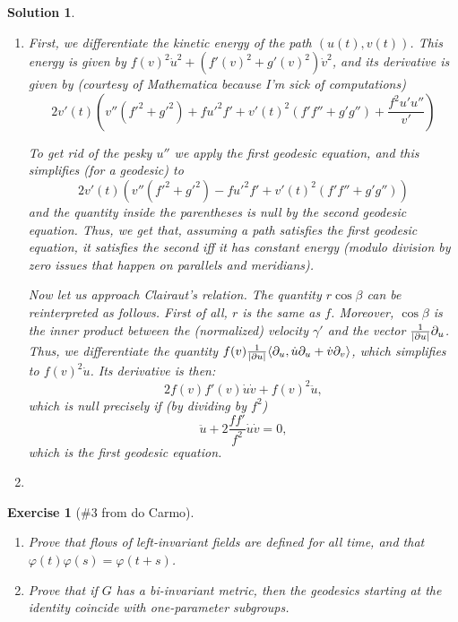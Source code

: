\documentclass{article}
\theoremstyle{plain}
\newtheorem*{ex}{Exercise}
\theoremstyle{nonumberplain}
\newtheorem{sol}{Solution}
\DeclarePairedDelimiter{\abs}{\lvert}{\rvert}
\DeclarePairedDelimiter{\braket}{\langle}{\rangle}
\begin{document}
\begin{sol}
\begin{enumerate}
\item First, we differentiate the kinetic energy of the path $(u(t), v(t))$. This energy is given by $f(v)^2 \dot u^2 + (f'(v)^2 + g'(v)^2) \dot v^2$, and its derivative is given by (courtesy of Mathematica because I'm sick of computations)
\begin{equation}
2 v'(t) \left( v'' \left(f'^2+g'^2\right)+f u'^2 f'+v'(t)^2 \left(f' f''+g' g''\right)+\frac{f^2 u' u''}{v'} \right)
\end{equation}

To get rid of the pesky $u''$ we apply the first geodesic equation, and this simplifies (for a geodesic) to
\begin{equation}
2 v'(t) \left( v'' \left(f'^2+g'^2\right)-f u'^2 f'+v'(t)^2 \left(f' f''+g' g''\right) \right)
\end{equation}
and the quantity inside the parentheses is null by the second geodesic equation. Thus, we get that, assuming a path satisfies the first geodesic equation, it satisfies the second iff it has constant energy (modulo division by zero issues that happen on parallels and meridians).

\smallskip

Now let us approach Clairaut's relation. The quantity $r \cos \beta$ can be reinterpreted as follows. First of all, $r$ is the same as $f$. Moreover, $\cos \beta$ is the inner product between the (normalized) velocity $\gamma'$ and the vector $\frac1{\abs{\partial u}} \partial_u$. Thus, we differentiate the quantity $f(v) \frac1{\abs{\partial u}} \braket{\partial_u, \dot u \partial_u + \dot v \partial_v}$, which simplifies to $f(v)^2 \dot u$. Its derivative is then:
\begin{equation}
2 f(v) f'(v) \dot u \dot v + f(v)^2 \ddot u,
\end{equation}
which is null precisely if (by dividing by $f^2$)
\begin{equation}
\ddot u +  2 \frac{f f'}{f^2} \dot u \dot v = 0,
\end{equation}
which is the first geodesic equation.

\item 
\end{enumerate}
\end{sol}

\begin{ex}[\#3 from do Carmo]
\leavevmode
\begin{enumerate}
\item Prove that flows of left-invariant fields are defined for all time, and that $\varphi(t) \varphi(s) = \varphi(t+s)$.
\item Prove that if $G$ has a bi-invariant metric, then the geodesics starting at the identity coincide with one-parameter subgroups.
\end{enumerate}
\end{ex}
\end{document}
